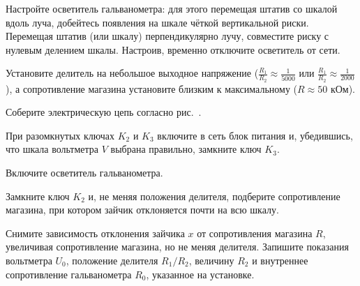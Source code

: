 \begin{lab:task}



	\item Настройте осветитель гальванометра: для этого перемещая штатив со
шкалой вдоль луча, добейтесь появления на шкале чёткой вертикальной
риски. Перемещая штатив (или шкалу) перпендикулярно лучу, совместите
риску с нулевым делением шкалы. Настроив, временно отключите осветитель
от сети.

	\item Установите делитель на небольшое выходное напряжение ($\frac{R_1}{R_2} \approx \frac{1}{5000}$ или $\frac{R_1}{R_2} \approx \frac{1}{2000}$), а
сопротивление магазина установите близким к максимальному ($R \approx 50$ кОм).

	\item Соберите электрическую цепь согласно рис.~.

	\item При разомкнутых ключах $K_2$ и
$K_3$ включите в сеть блок питания и, убедившись,
что шкала вольтметра $V$ выбрана правильно, замкните ключ
$K_3$.

	\item Включите осветитель гальванометра.

	\item Замкните ключ $K_2$ и, не меняя положения
делителя, подберите сопротивление магазина, при котором зайчик
отклоняется почти на всю шкалу.


	\item Снимите зависимость отклонения зайчика $x$ от сопротивления
магазина $R$, увеличивая сопротивление магазина, но не меняя
делителя. Запишите показания вольтметра $U_0$,
положение делителя $R_1/R_2$,
величину $R_2$ и внутреннее сопротивление
гальванометра $R_0$, указанное на установке.



\end{lab:task}
